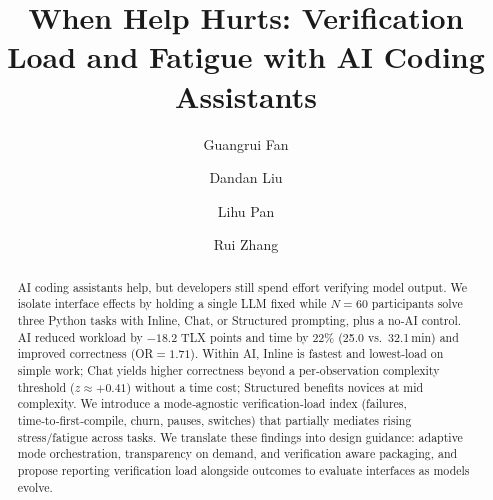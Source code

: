 \documentclass[sigconf]{acmart}
\begin{document}
\title{When Help Hurts: Verification Load and Fatigue with AI Coding Assistants}

\author{Guangrui Fan}

\author{Dandan Liu}

\author{Lihu Pan}

\author{Rui Zhang}

\renewcommand{\shortauthors}{Guangrui Fan, Dandan Liu, Lihu Pan and Rui Zhang}



\begin{abstract}
AI coding assistants help, but developers still spend effort verifying model output. We isolate interface effects by holding a single LLM fixed while $N{=}60$ participants solve three Python tasks with Inline, Chat, or Structured prompting, plus a no‑AI control. AI reduced workload by $-18.2$ TLX points and time by 22\% (25.0 vs.\ 32.1\,min) and improved correctness (OR$=1.71$). Within AI, Inline is fastest and lowest‑load on simple work; Chat yields higher correctness beyond a per‑observation complexity threshold ($z{\approx}{+}0.41$) without a time cost; Structured benefits novices at mid complexity. We introduce a mode‑agnostic verification‑load index (failures, time‑to‑first‑compile, churn, pauses, switches) that partially mediates rising stress/fatigue across tasks. We translate these findings into design guidance: adaptive mode orchestration, transparency on demand, and verification aware packaging, and propose reporting verification load alongside outcomes to evaluate interfaces as models evolve.
\end{abstract}
\end{document}

